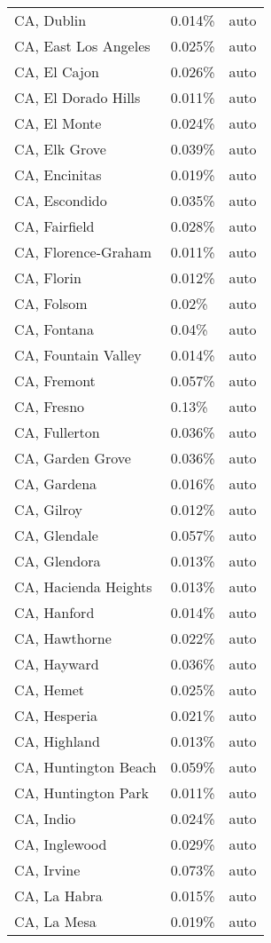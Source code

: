 \begin{longtable}[]{@{}lll@{}}
CA, Dublin & 0.014\% & auto \\
CA, East Los Angeles & 0.025\% & auto \\
CA, El Cajon & 0.026\% & auto \\
CA, El Dorado Hills & 0.011\% & auto \\
CA, El Monte & 0.024\% & auto \\
CA, Elk Grove & 0.039\% & auto \\
CA, Encinitas & 0.019\% & auto \\
CA, Escondido & 0.035\% & auto \\
CA, Fairfield & 0.028\% & auto \\
CA, Florence-Graham & 0.011\% & auto \\
CA, Florin & 0.012\% & auto \\
CA, Folsom & 0.02\% & auto \\
CA, Fontana & 0.04\% & auto \\
CA, Fountain Valley & 0.014\% & auto \\
CA, Fremont & 0.057\% & auto \\
CA, Fresno & 0.13\% & auto \\
CA, Fullerton & 0.036\% & auto \\
CA, Garden Grove & 0.036\% & auto \\
CA, Gardena & 0.016\% & auto \\
CA, Gilroy & 0.012\% & auto \\
CA, Glendale & 0.057\% & auto \\
CA, Glendora & 0.013\% & auto \\
CA, Hacienda Heights & 0.013\% & auto \\
CA, Hanford & 0.014\% & auto \\
CA, Hawthorne & 0.022\% & auto \\
CA, Hayward & 0.036\% & auto \\
CA, Hemet & 0.025\% & auto \\
CA, Hesperia & 0.021\% & auto \\
CA, Highland & 0.013\% & auto \\
CA, Huntington Beach & 0.059\% & auto \\
CA, Huntington Park & 0.011\% & auto \\
CA, Indio & 0.024\% & auto \\
CA, Inglewood & 0.029\% & auto \\
CA, Irvine & 0.073\% & auto \\
CA, La Habra & 0.015\% & auto \\
CA, La Mesa & 0.019\% & auto \\

\end{longtable}
